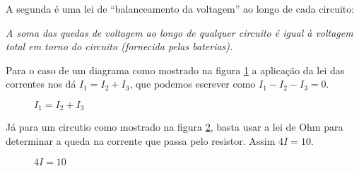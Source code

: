 A segunda é uma lei de ``balanceamento da voltagem'' ao longo de cada circuito:

\begin{tcolorbox}[colback=green!30, colframe=green!80!blue, title=Lei da Voltagem (circuitos)]
    \textit{A soma das quedas de voltagem ao longo de qualquer circuito é igual à voltagem total em torno do circuito (fornecida pelas baterias).}
\end{tcolorbox}

Para o caso de um diagrama como mostrado na figura \ref{correntedividindo} a aplicação da lei das correntes nos dá $I_1 = I_2 + I_3$, que podemos escrever como $I_1 - I_2 - I_3 = 0$.
\begin{figure}[!h]
    \centering
    
    \caption{$I_1 = I_2 + I_3$}
    \label{correntedividindo}
\end{figure}

Já para um circutio como mostrado na figura \ref{circuitocomumrsistor}, basta usar a lei de Ohm para determinar a queda na corrente que passa pelo resistor. Assim $4I = 10$.
\begin{figure}[!h]
    \centering
    
    \caption{$4I = 10$}
    \label{circuitocomumrsistor}
\end{figure}

